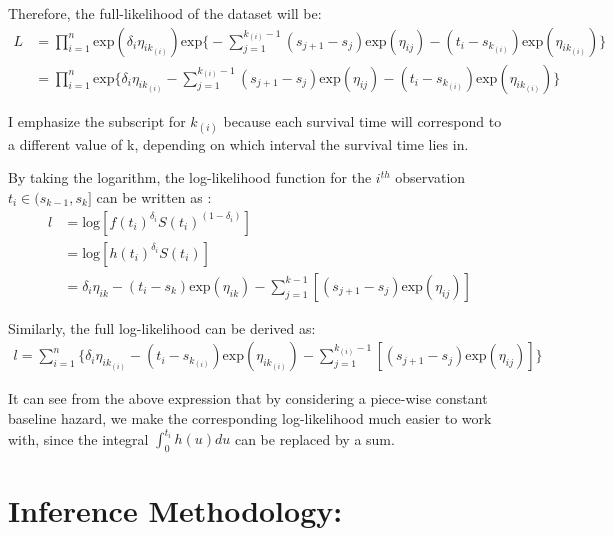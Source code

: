 \documentclass[]{article}
\begin{document}
Therefore, the full-likelihood of the dataset will be:
\begin{equation}\begin{aligned}\label{eqn:fulllike}
L &=  \prod_{i=1}^{n} \text{exp}(\delta_i \eta_{ik_{(i)}}) \text{exp} \bigg\{-\sum_{j=1}^{k_{(i)}-1} (s_{j+1}-s_j)\text{exp}(\eta_{ij})-(t_i - s_{k_{(i)}})\text{exp}(\eta_{ik_{(i)}})\bigg \} \\
  &= \prod_{i=1}^{n} \text{exp} \big \{\delta_i \eta_{ik_{(i)}} -\sum_{j=1}^{k_{(i)}-1} (s_{j+1}-s_j)\text{exp}(\eta_{ij})-(t_i - s_{k_{(i)}})\text{exp}(\eta_{ik_{(i)}}) \big \}
\end{aligned}\end{equation}

I emphasize the subscript for \(k_{(i)}\) because each survival time
will correspond to a different value of k, depending on which interval
the survival time lies in.

By taking the logarithm, the log-likelihood function for the \(i^{th}\)
observation \(t_i \in (s_{k-1},s_k]\) can be written as :
\begin{equation}\begin{aligned}\label{eqn:loglike}
l &= \text{log}[f(t_i)^{\delta_i}S(t_i)^{(1-\delta_i)}] \\
  &= \text{log}[h(t_i)^{\delta_i}S(t_i)]\\
  &= \delta_i \eta_{ik} - (t_i-s_k)\text{exp}(\eta_{ik})-\sum_{j=1}^{k-1} [(s_{j+1}-s_j)\text{exp}(\eta_{ij})]
\end{aligned}\end{equation}

Similarly, the full log-likelihood can be derived as:
\begin{equation}\begin{aligned}\label{eqn:fullloglike1}
l = \sum_{i=1}^{n} \bigg \{ \delta_i \eta_{ik_{(i)}} - (t_i-s_{k_{(i)}})\text{exp}(\eta_{ik_{(i)}})-\sum_{j=1}^{{k_{(i)}}-1} [(s_{j+1}-s_j)\text{exp}(\eta_{ij})]\bigg \}
\end{aligned}\end{equation}

It can see from the above expression that by considering a piece-wise
constant baseline hazard, we make the corresponding log-likelihood much
easier to work with, since the integral \(\int_{0}^{t_i} h(u)du\) can be
replaced by a sum.

\hypertarget{inference-methodology}{%
\section{Inference Methodology:}\label{inference-methodology}}
\end{document}
